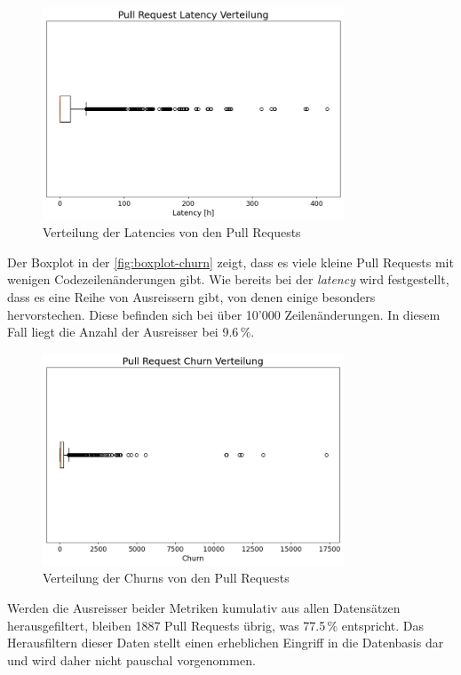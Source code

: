 \begin{figure}[htbp]
    \includegraphics[width=0.8\textwidth]{Figures/boxplot-latency.png}
    \centering
    \caption{Verteilung der Latencies von den Pull Requests}
    \label{fig:boxplot-latency}
\end{figure}
 \newpage
Der Boxplot in der \autoref{fig:boxplot-churn} zeigt, dass es viele kleine Pull Requests mit wenigen Codezeilenänderungen gibt. Wie bereits bei der \textit{latency} wird festgestellt, dass es eine Reihe von Ausreissern gibt, von denen einige besonders hervorstechen. Diese befinden sich bei über 10'000 Zeilenänderungen. In diesem Fall liegt die Anzahl der Ausreisser bei 9.6\,\%.

\begin{figure}[htbp]
    \includegraphics[width=0.8\textwidth]{Figures/boxplot-churn.png}
      \centering
    \caption{Verteilung der Churns von den Pull Requests}
    \label{fig:boxplot-churn}
\end{figure}
\newpage
Werden die Ausreisser beider Metriken kumulativ aus allen Datensätzen herausgefiltert, bleiben 1887 Pull Requests übrig, was 77.5\,\% entspricht. Das Herausfiltern dieser Daten stellt einen erheblichen Eingriff in die Datenbasis dar und wird daher nicht pauschal vorgenommen.

